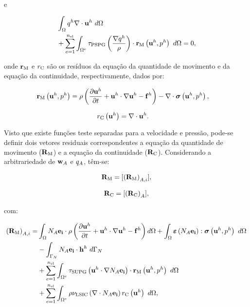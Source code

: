 \documentclass[tese_patricia]{subfiles}%
\begin{document}
\noindent e

\begin{align}
	\begin{split}
	&\int_{\Omega}q^h \nabla \cdot \mathbf{u}^h \ d\Omega \\ 
	&+ \sum_{e=1}^{n_{\mathrm{el}}} \int_{\Omega^e} \tau_{\mathrm{PSPG}} \left(\frac{\nabla q^h}{\rho}\right) \cdot \mathbf{r}_{\mathrm{M}}\left(\mathbf{u}^h,p^h\right) \  d\Omega = 0,
	\label{eq:RC}
	\end{split}
	\end{align}

\noindent onde $\mathbf{r}_{\mathrm{M}}$ e ${r}_{\mathrm{C}}$ são os resíduos da equação da quantidade de movimento e da equação da continuidade, respectivamente, dados por:

\begin{align}
\mathbf{r}_{\mathrm{M}}\left(\mathbf{u}^h,p^h\right)&=\rho\left(\frac{\partial\mathbf{u}^h}{\partial t}+\mathbf{u}^h\cdot \nabla\mathbf{u}^h - \mathbf{f}^h\right) - \nabla \cdot \boldsymbol{\sigma}\left(\mathbf{u}^h,p^h\right),
\end{align}

\noindent

\begin{align}
{r}_{\mathrm{C}}\left(\mathbf{u}^h\right)&=\nabla \cdot \mathbf{u}^h.
\end{align}

Visto que existe funções teste separadas para a velocidade e pressão, pode-se definir dois vetores residuais correspondentes a equação da quantidade de movimento ($\mathbf{R}_\mathrm{M}$) e a equação da continuidade ($\mathbf{R}_\mathrm{C}$). Considerando a arbitrariedade de $\mathbf{w}_{A}$ e $q_{A}$, têm-se:

\begin{align}
\mathbf{R}_\mathrm{M}  = [\left(\mathbf{R}_\mathrm{M}\right)_{A,i}],
\end{align}

\begin{align}
	\mathbf{R}_\mathrm{C} =  [\left(\mathbf{R}_\mathrm{C}\right)_{A}],
\end{align}
	
\noindent com:

\begin{align}
	\begin{split}
	\left(\NNSM\right)_{A,i} =&\int_{\domain} N_{A}\mathbf{e_i} \cdot \density\left(\frac{\partial\velocityh}{\partial t}+\velocityh\cdot \nabla\velocityh - \sbodyforce^h\right) d\domain +\int_{\domain} \straintensor \left(N_{A}\mathbf{e_i}\right) : \stresstensor \left(\velocityh,\pressh\right)\ d\domain\\ &
	- \int_{\boundary_N}N_{A}\mathbf{e_i} \cdot \straction^h\ d\boundary_N\\ 
	&+ \sum_{e=1}^{\nel} \int_{\domainE} \SUPG \left(\velocityh \cdot \nabla N_{A}\mathbf{e_i}\right) \cdot \resMom\left(\velocityh,\pressh \right)\  d\domain\\
	&+ \sum_{e=1}^{\nel} \int_{\domainE} \density \LSIC \left(\nabla \cdot N_{A}\mathbf{e_i}\right) \resPre\left(\velocityh\right)\  d\domain  ,
	\end{split}
\end{align}
\end{document}

